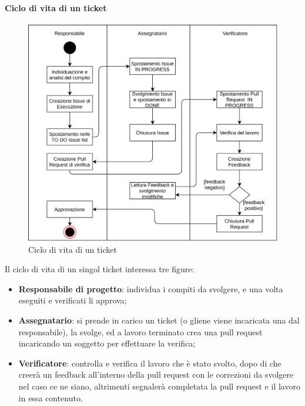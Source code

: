 \paragraph{Ciclo di vita di un ticket} \label{_cicloVitaTicket}
\begin{figure}[H]
    \centering
    \includegraphics[scale=0.35]{res/images/ciclo_vita_ticket.jpg}
    \caption{Ciclo di vita di un ticket}
\end{figure}
Il ciclo di vita di un singol ticket interessa tre figure:
\begin{itemize}
    \item \textbf{Responsabile di progetto}: individua i compiti da svolgere, e una volta eseguiti e verificati li approva;
    \item \textbf{Assegnatario}: si prende in carico un ticket (o gliene viene incaricata una dal responsabile), la svolge, ed a lavoro terminato crea una pull request incaricando un soggetto per effettuare la verifica;
    \item \textbf{Verificatore}: controlla e verifica il lavoro che è stato svolto, dopo di che creerà un feedback all'interno della pull request con le correzioni da svolgere nel caso ce ne siano, altrimenti segnalerà completata la pull request e il lavoro in essa contenuto.
\end{itemize}

